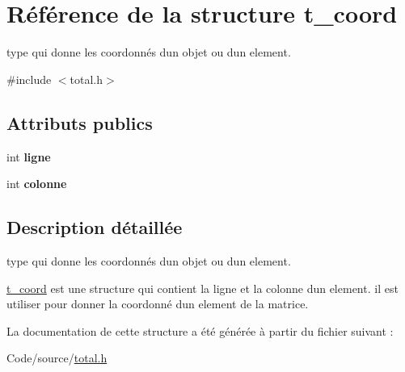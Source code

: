 \hypertarget{structt__coord}{}\section{Référence de la structure t\+\_\+coord}
\label{structt__coord}


type qui donne les coordonnés d\textquotesingle{}un objet ou d\textquotesingle{}un element.  




{\ttfamily \#include $<$total.\+h$>$}

\subsection*{Attributs publics}
\begin{DoxyCompactItemize}
\item 
int {\bfseries ligne}\hypertarget{structt__coord_a009f88610a7056e1252cab53887301da}{}\label{structt__coord_a009f88610a7056e1252cab53887301da}

\item 
int {\bfseries colonne}\hypertarget{structt__coord_a4f727b6e97b65d77281b4c119681ed59}{}\label{structt__coord_a4f727b6e97b65d77281b4c119681ed59}

\end{DoxyCompactItemize}


\subsection{Description détaillée}
type qui donne les coordonnés d\textquotesingle{}un objet ou d\textquotesingle{}un element. 

\hyperlink{structt__coord}{t\+\_\+coord} est une structure qui contient la ligne et la colonne d\textquotesingle{}un element. il est utiliser pour donner la coordonné d\textquotesingle{}un element de la matrice. 

La documentation de cette structure a été générée à partir du fichier suivant \+:\begin{DoxyCompactItemize}
\item 
Code/source/\hyperlink{total_8h}{total.\+h}\end{DoxyCompactItemize}

